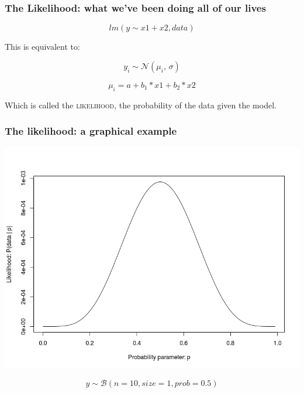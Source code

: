 \documentclass{beamer}
\begin{document}
 \begin{frame}
  \frametitle{\bf The Likelihood: what we've been doing all of our lives}
  
 \[
  lm(y \sim x1 + x2, data)
 \]

  
  This is equivalent to:
  
  \[
   y_i \sim \mathcal{N}(\mu_i,\, \sigma)   
   \]
   
   \[
    \mu_i = a + b_1 * x1 + b_2 * x2
   \]

Which is called the \textsc{likelihood}, the probability of the data given the model. 
   
  
  
 \end{frame}
 
 \begin{frame}
  \frametitle{The likelihood: a graphical example}
  
  \includegraphics[width=\textwidth,height=.75\textheight,keepaspectratio]{likelihood.png}
  
  \[
   y \sim \mathcal{B}(n = 10,size = 1,prob = 0.5)
  \]
  

  
 \end{frame}
\end{document}
